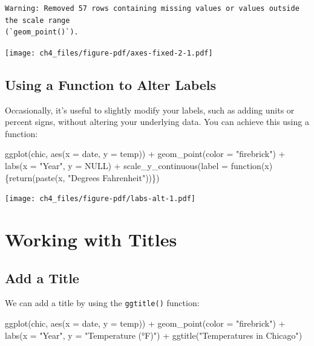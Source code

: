 \documentclass[
  letterpaper,
]{scrbook}
\newenvironment{Shaded}{\begin{snugshade}}{\end{snugshade}}
\newcommand{\AttributeTok}[1]{\textcolor[rgb]{0.40,0.45,0.13}{#1}}
\newcommand{\ConstantTok}[1]{\textcolor[rgb]{0.56,0.35,0.01}{#1}}
\newcommand{\ControlFlowTok}[1]{\textcolor[rgb]{0.00,0.23,0.31}{#1}}
\newcommand{\FunctionTok}[1]{\textcolor[rgb]{0.28,0.35,0.67}{#1}}
\newcommand{\NormalTok}[1]{\textcolor[rgb]{0.00,0.23,0.31}{#1}}
\newcommand{\SpecialCharTok}[1]{\textcolor[rgb]{0.37,0.37,0.37}{#1}}
\newcommand{\StringTok}[1]{\textcolor[rgb]{0.13,0.47,0.30}{#1}}
\begin{document}
\begin{verbatim}
Warning: Removed 57 rows containing missing values or values outside the scale range
(`geom_point()`).
\end{verbatim}

\texttt{[image: ch4\_files/figure-pdf/axes-fixed-2-1.pdf]}

\section{Using a Function to Alter
Labels}\label{using-a-function-to-alter-labels}

Occasionally, it's useful to slightly modify your labels, such as adding
units or percent signs, without altering your underlying data. You can
achieve this using a function:

\begin{Shaded}
\begin{Highlighting}[]
\FunctionTok{ggplot}\NormalTok{(chic, }\FunctionTok{aes}\NormalTok{(}\AttributeTok{x =}\NormalTok{ date, }\AttributeTok{y =}\NormalTok{ temp)) }\SpecialCharTok{+}
  \FunctionTok{geom\_point}\NormalTok{(}\AttributeTok{color =} \StringTok{"firebrick"}\NormalTok{) }\SpecialCharTok{+}
  \FunctionTok{labs}\NormalTok{(}\AttributeTok{x =} \StringTok{"Year"}\NormalTok{, }\AttributeTok{y =} \ConstantTok{NULL}\NormalTok{) }\SpecialCharTok{+}
  \FunctionTok{scale\_y\_continuous}\NormalTok{(}\AttributeTok{label =} \ControlFlowTok{function}\NormalTok{(x) \{}\FunctionTok{return}\NormalTok{(}\FunctionTok{paste}\NormalTok{(x, }\StringTok{"Degrees Fahrenheit"}\NormalTok{))\})}
\end{Highlighting}
\end{Shaded}

\texttt{[image: ch4\_files/figure-pdf/labs-alt-1.pdf]}


\chapter{Working with Titles}\label{titles}

\section{Add a Title}\label{add-a-title}

We can add a title by using the \texttt{ggtitle()} function:

\begin{Shaded}
\begin{Highlighting}[]
\FunctionTok{ggplot}\NormalTok{(chic, }\FunctionTok{aes}\NormalTok{(}\AttributeTok{x =}\NormalTok{ date, }\AttributeTok{y =}\NormalTok{ temp)) }\SpecialCharTok{+}
  \FunctionTok{geom\_point}\NormalTok{(}\AttributeTok{color =} \StringTok{"firebrick"}\NormalTok{) }\SpecialCharTok{+}
  \FunctionTok{labs}\NormalTok{(}\AttributeTok{x =} \StringTok{"Year"}\NormalTok{, }\AttributeTok{y =} \StringTok{"Temperature (°F)"}\NormalTok{) }\SpecialCharTok{+}
  \FunctionTok{ggtitle}\NormalTok{(}\StringTok{"Temperatures in Chicago"}\NormalTok{)}
\end{Highlighting}
\end{Shaded}
\end{document}
